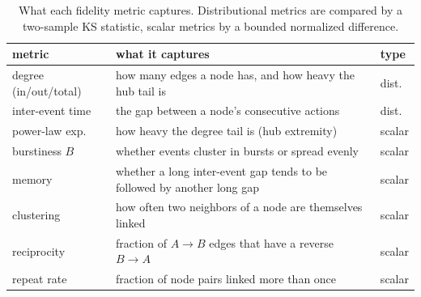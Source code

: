 \documentclass[sigconf,review,anonymous]{acmart}
\begin{document}
\begin{table}[t]
\caption{What each fidelity metric captures. Distributional metrics are compared by a
two-sample KS statistic, scalar metrics by a bounded normalized difference.}
\label{tab:metrics}
\footnotesize\centering
\setlength{\tabcolsep}{3pt}
\begin{tabular}{@{}>{\raggedright\arraybackslash}p{} >{\raggedright\arraybackslash}p{} l@{}}
\toprule
metric & what it captures & type \\
\midrule
degree (in/out/total) & how many edges a node has, and how heavy the hub tail is & dist. \\
inter-event time & the gap between a node's consecutive actions & dist. \\
power-law exp.\ \cite{clauset2009powerlaw} & how heavy the degree tail is (hub extremity) & scalar \\
burstiness $B$ \cite{goh2008burstiness,kim2016burstiness} & whether events cluster in bursts or spread evenly & scalar \\
memory \cite{goh2008burstiness} & whether a long inter-event gap tends to be followed by another long gap & scalar \\
clustering \cite{watts1998smallworld} & how often two neighbors of a node are themselves linked & scalar \\
reciprocity & fraction of $A\!\to\!B$ edges that have a reverse $B\!\to\!A$ & scalar \\
repeat rate & fraction of node pairs linked more than once & scalar \\
\bottomrule
\end{tabular}
\end{table}
\end{document}
